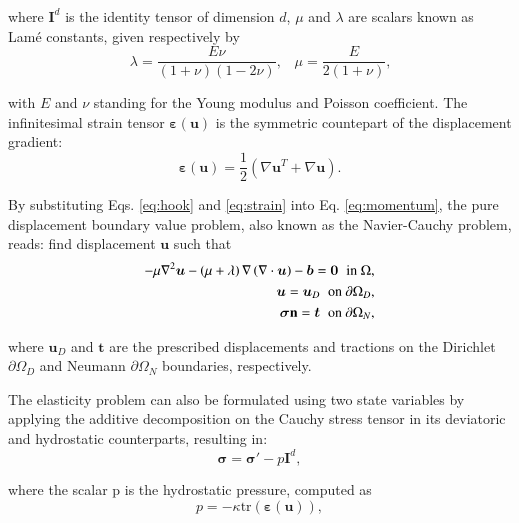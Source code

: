 \documentclass[english,11pt,3p,number,sort&compress]{elsarticle}
\begin{document}
\noindent where $\mathbf{I}^d$ is the identity tensor of dimension $d$, $\mu$ and $\lambda$ are scalars known as Lam\'{e} constants, given respectively by
\begin{equation}
	\lambda = \frac{E\nu}{(1+\nu)(1-2\nu)} \text{,} \quad \mu = \frac{E}{2(1+\nu)} \text{,}
\end{equation}

\noindent with $E$ and $\nu$ standing for the Young modulus and Poisson coefficient. The infinitesimal strain tensor $\bm{\varepsilon}(\bm{u})$ is the symmetric countepart of the displacement gradient:
\begin{equation} \label{eq:strain}
    \bm{\varepsilon}(\bm{u})=\frac{1}{2}(\nabla\bm{u}^T+\nabla\bm{u}) \text{.}
\end{equation}

By substituting Eqs. \eqref{eq:hook} and \eqref{eq:strain} into Eq. \eqref{eq:momentum}, the pure displacement boundary value problem, also known as the Navier-Cauchy problem, reads: find displacement $\bm{u}$ such that
\begin{subequations} \label{eq:navier-cauchy}
	\begin{align}
		-\mu\nabla^2\bm{u} -\left(\mu+\lambda \right)\nabla\left(\nabla \cdot \bm{u} \right) - \bm{b} = \bm{0} \hspace{0.2cm} \text{in } \Omega ,&\\
		\bm{u} = \bm{u}_D \hspace{0.2cm} \text{on } \partial\Omega_D ,&\\
		\bm{\sigma} \mathbf{n} = \bm{t} \hspace{0.2cm} \text{on } \partial\Omega_N ,&
	\end{align}
\end{subequations}

\noindent where $\bm{u}_D$ and $\bm{t}$ are the prescribed displacements and tractions on the Dirichlet $\partial\Omega_D$ and Neumann $\partial\Omega_N$ boundaries, respectively.

The elasticity problem can also be formulated using two state variables by applying the additive decomposition on the Cauchy stress tensor in its deviatoric and hydrostatic counterparts, resulting in:
\begin{equation} \label{eq:stress-decomposition}
	\bm{\sigma} = \bm{\sigma}' - p\bm{I}^d ,
\end{equation}

\noindent where the scalar p is the hydrostatic pressure, computed as
\begin{equation} \label{eq:pressure}
	p = -\kappa \text{tr}(\bm{\varepsilon}(\bm{u})) ,
\end{equation}
\end{document}
